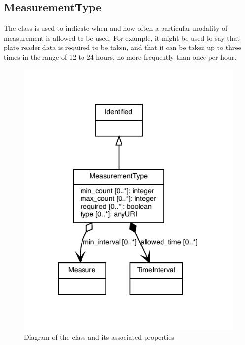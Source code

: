 \subsection{MeasurementType}
\label{sec:MeasurementType}

The  class is used to indicate when and how often a particular modality of measurement is allowed to be used.
For example, it might be used to say that plate reader data is required to be taken, and that it can be taken up to three times in the range of 12 to 24 hours, no more frequently than once per hour.

\begin{figure}[ht]
\begin{center}
\includegraphics[scale=0.8]{figures/MeasurementType}
\caption[]{Diagram of the  class and its associated properties}
\label{uml:MeasurementType}
\end{center}
\end{figure}


